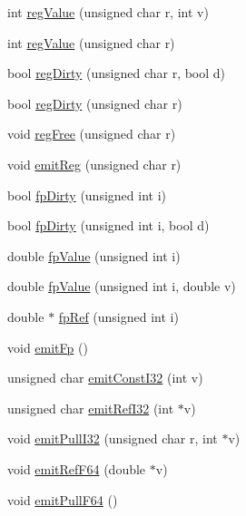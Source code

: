 \begin{DoxyCompactItemize}
int \hyperlink{classnightowl_1_1Builder_a5a4122e0638cf0c8f1eb948b763d6c37}{reg\-Value} (unsigned char r, int v)
\item 
int \hyperlink{classnightowl_1_1Builder_aa5bbaf7d3212e18433e3cf37e2dabc65}{reg\-Value} (unsigned char r)
\item 
bool \hyperlink{classnightowl_1_1Builder_ade57674302a3049d39d8415f7b8a57f8}{reg\-Dirty} (unsigned char r, bool d)
\item 
bool \hyperlink{classnightowl_1_1Builder_a5d4dcb1f40b8b49e2fe96fd946b1d427}{reg\-Dirty} (unsigned char r)
\item 
void \hyperlink{classnightowl_1_1Builder_acfdf9c3cc11f4e7f7c99a7d6e05ff378}{reg\-Free} (unsigned char r)
\item 
void \hyperlink{classnightowl_1_1Builder_a81de0277884344743c0bfe347af818cc}{emit\-Reg} (unsigned char r)
\item 
bool \hyperlink{classnightowl_1_1Builder_a56095d67b20ff747c22203325be99c87}{fp\-Dirty} (unsigned int i)
\item 
bool \hyperlink{classnightowl_1_1Builder_a727f1525e1aaa3e72a58d1ac79661425}{fp\-Dirty} (unsigned int i, bool d)
\item 
double \hyperlink{classnightowl_1_1Builder_a702ec16584a1b1c9db469c54bb254c82}{fp\-Value} (unsigned int i)
\item 
double \hyperlink{classnightowl_1_1Builder_a09cea2791f29e46b10fa69de3ead05da}{fp\-Value} (unsigned int i, double v)
\item 
double $\ast$ \hyperlink{classnightowl_1_1Builder_ac4afa1fb5c5497f1d66f8e70014786c0}{fp\-Ref} (unsigned int i)
\item 
void \hyperlink{classnightowl_1_1Builder_acc3abe19c736078a015263a4af4a8d79}{emit\-Fp} ()
\item 
unsigned char \hyperlink{classnightowl_1_1Builder_ab357d48d43855f8706ae513ccee976a5}{emit\-Const\-I32} (int v)
\item 
unsigned char \hyperlink{classnightowl_1_1Builder_a8be641f244fc23bbf88cc31613831ca4}{emit\-Ref\-I32} (int $\ast$v)
\item 
void \hyperlink{classnightowl_1_1Builder_adecf4a9b7ca3d7ebb910d60477e4bdae}{emit\-Pull\-I32} (unsigned char r, int $\ast$v)
\item 
void \hyperlink{classnightowl_1_1Builder_adec8eaa6414ced56fbf5e90754c9e55c}{emit\-Ref\-F64} (double $\ast$v)
\item 
void \hyperlink{classnightowl_1_1Builder_a956e0bb10ad0155cd507c4569f6ce105}{emit\-Pull\-F64} ()
\item 

\end{DoxyCompactItemize}

